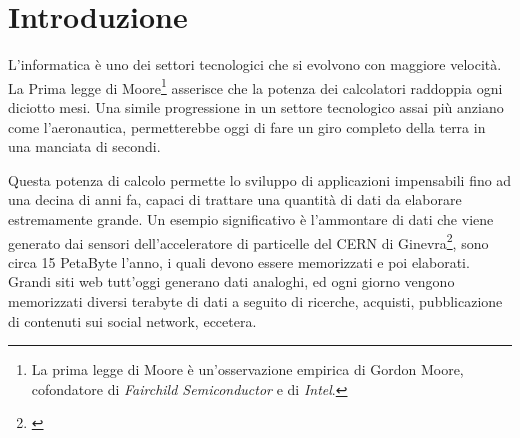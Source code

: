 
\chapter{Introduzione}\label{cap:introduzione}
L'informatica è uno dei settori tecnologici che si evolvono con maggiore velocità. La Prima legge di Moore\footnote{La prima legge di Moore è un'osservazione empirica di Gordon Moore, cofondatore di \emph{Fairchild Semiconductor} e di \emph{Intel}.} asserisce che la potenza dei calcolatori raddoppia ogni diciotto mesi. Una simile progressione in un settore tecnologico assai più anziano come l'aeronautica, permetterebbe oggi di fare un giro completo della terra in una manciata di secondi. 

Questa potenza di calcolo permette lo sviluppo di applicazioni impensabili fino ad una decina di anni fa, capaci di trattare una quantità di dati da elaborare estremamente grande. Un esempio significativo è l'ammontare di dati che viene generato dai sensori dell'acceleratore di particelle del CERN di Ginevra\footnote{\cite{pres_cern}}, sono circa 15 PetaByte l'anno, i quali devono essere memorizzati e poi elaborati. Grandi siti web tutt'oggi generano dati analoghi, ed ogni giorno vengono memorizzati diversi terabyte di dati a seguito di ricerche, acquisti, pubblicazione di contenuti sui social network, eccetera. 
